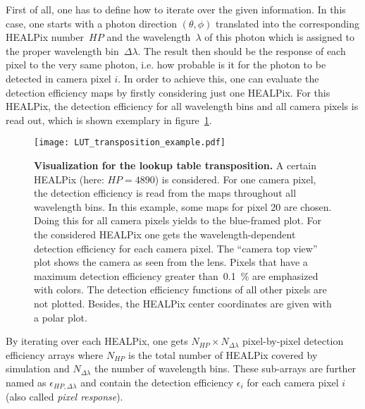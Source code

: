 First of all, one has to define how to iterate over the given information. In this case, one starts with a photon direction $(\theta,\phi)$ translated into the corresponding HEALPix number~$HP$ and the wavelength~$\lambda$ of this photon which is assigned to the proper wavelength bin~$\Delta\lambda$. The result then should be the response of each pixel to the very same photon, i.e. how probable is it for the photon to be detected in camera pixel $i$. In order to achieve this, one can evaluate the detection efficiency maps by firstly considering just one HEALPix. For this HEALPix, the detection efficiency for all wavelength bins and all camera pixels is read out, which is shown exemplary in figure~\ref{lut:transpose_example}. 

\begin{figure}[H]
	\texttt{[image: LUT\_transposition\_example.pdf]}
	\caption[Visualization for the lookup table transposition]{\textbf{Visualization for the lookup table transposition.} A certain HEALPix (here: $HP=\num{4890}$) is considered. For one camera pixel, the detection efficiency is read from the maps throughout all wavelength bins. In this example, some maps for pixel \num{20} are chosen. Doing this for all camera pixels yields to the blue-framed plot. For the considered HEALPix one gets the wavelength-dependent detection efficiency for each camera pixel. The \enquote{camera top view} plot shows the camera as seen from the lens. Pixels that have a maximum detection efficiency greater than~\SI{0.1}{\percent} are emphasized with colors. The detection efficiency functions of all other pixels are not plotted. Besides, the HEALPix center coordinates are given with a polar plot.}
	\label{lut:transpose_example}
\end{figure}

By iterating over each HEALPix, one gets $N_{HP}\times N_{\Delta\lambda}$ pixel-by-pixel detection efficiency arrays where $N_{HP}$ is the total number of HEALPix covered by simulation and $N_{\Delta\lambda}$ the number of wavelength bins. These sub-arrays are further named as $\epsilon_{HP,\Delta\lambda}$ and contain the detection efficiency $\epsilon_i$ for each camera pixel $i$ (also called \textit{pixel response}). 

